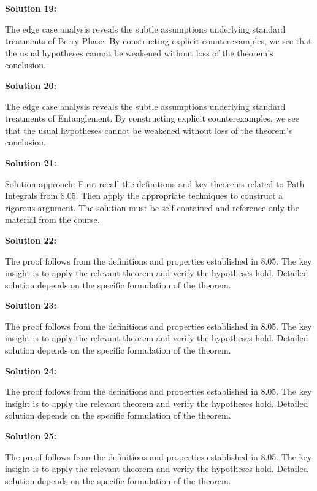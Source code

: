 \documentclass[12pt,a4paper]{exam}
\begin{document}
\vspace{0.5cm}

\textbf{Solution 19:}

The edge case analysis reveals the subtle assumptions underlying standard treatments of Berry Phase. By constructing explicit counterexamples, we see that the usual hypotheses cannot be weakened without loss of the theorem's conclusion.

\vspace{0.5cm}

\textbf{Solution 20:}

The edge case analysis reveals the subtle assumptions underlying standard treatments of Entanglement. By constructing explicit counterexamples, we see that the usual hypotheses cannot be weakened without loss of the theorem's conclusion.

\vspace{0.5cm}

\textbf{Solution 21:}

Solution approach: First recall the definitions and key theorems related to Path Integrals from 8.05. Then apply the appropriate techniques to construct a rigorous argument. The solution must be self-contained and reference only the material from the course.

\vspace{0.5cm}

\textbf{Solution 22:}

The proof follows from the definitions and properties established in 8.05. The key insight is to apply the relevant theorem and verify the hypotheses hold. Detailed solution depends on the specific formulation of the theorem.

\vspace{0.5cm}

\textbf{Solution 23:}

The proof follows from the definitions and properties established in 8.05. The key insight is to apply the relevant theorem and verify the hypotheses hold. Detailed solution depends on the specific formulation of the theorem.

\vspace{0.5cm}

\textbf{Solution 24:}

The proof follows from the definitions and properties established in 8.05. The key insight is to apply the relevant theorem and verify the hypotheses hold. Detailed solution depends on the specific formulation of the theorem.

\vspace{0.5cm}

\textbf{Solution 25:}

The proof follows from the definitions and properties established in 8.05. The key insight is to apply the relevant theorem and verify the hypotheses hold. Detailed solution depends on the specific formulation of the theorem.

\vspace{0.5cm}
\end{document}
